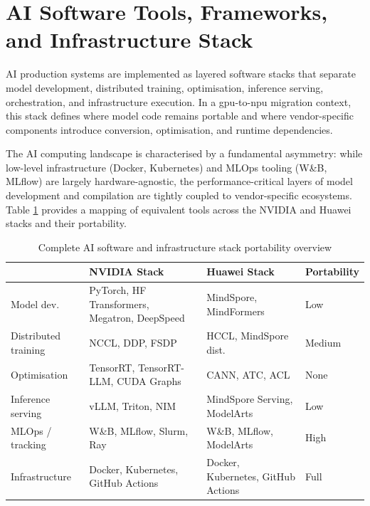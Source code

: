 
\section{AI Software Tools, Frameworks, and Infrastructure Stack}
\label{sec:software-stack}

AI production systems are implemented as layered software stacks that
separate model development, distributed training, optimisation,
inference serving, orchestration, and infrastructure execution.
In a \acrshort{gpu}-to-\acrshort{npu} migration context, this stack
defines where model code remains portable and where vendor-specific
components introduce conversion, optimisation, and runtime dependencies.

The AI computing landscape is characterised by a fundamental asymmetry:
while low-level infrastructure (Docker, Kubernetes) and MLOps tooling
(W\&B, MLflow) are largely hardware-agnostic, the performance-critical
layers of model development and compilation are tightly coupled to
vendor-specific ecosystems. Table \ref{tab:full-stack} provides a mapping
of equivalent tools across the NVIDIA and Huawei stacks and their
portability.

\begin{table}[htbp]
  \centering
  \caption{Complete AI software and infrastructure stack portability overview}
  \label{tab:full-stack}
  \begin{tabularx}{\textwidth}{lXXl}
    \toprule
    \tableheader{Layer & NVIDIA Stack & Huawei Stack & Portability} \\
    \midrule
    Model dev.
      & PyTorch, HF Transformers, Megatron, DeepSpeed
      & MindSpore, MindFormers
      & Low \\
    \rowcolor{TableRowOdd}
    Distributed training
      & NCCL, DDP, FSDP
      & HCCL, MindSpore dist.
      & Medium \\
    Optimisation
      & TensorRT, TensorRT-LLM, CUDA Graphs
      & CANN, ATC, ACL
      & None \\
    \rowcolor{TableRowOdd}
    Inference serving
      & vLLM, Triton, NIM
      & MindSpore Serving, ModelArts
      & Low \\
    MLOps / tracking
      & W\&B, MLflow, Slurm, Ray
      & W\&B, MLflow, ModelArts
      & High \\
    \rowcolor{TableRowOdd}
    Infrastructure
      & Docker, Kubernetes, GitHub Actions
      & Docker, Kubernetes, GitHub Actions
      & Full \\
    \bottomrule
  \end{tabularx}
\end{table}

